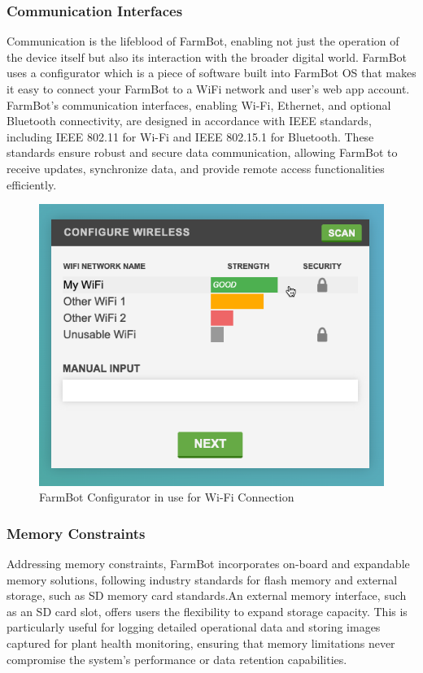 \subsubsection{Communication Interfaces}
Communication is the lifeblood of FarmBot, enabling not just the operation of the device itself but also its interaction with the broader digital world. FarmBot uses a configurator which  is a piece of software built into FarmBot OS that makes it easy to connect your FarmBot to a WiFi network and user's web app account. FarmBot's communication interfaces, enabling Wi-Fi, Ethernet, and optional Bluetooth connectivity, are designed in accordance with IEEE standards, including IEEE 802.11 for Wi-Fi and IEEE 802.15.1 for Bluetooth. These standards ensure robust and secure data communication, allowing FarmBot to receive updates, synchronize data, and provide remote access functionalities efficiently.

\begin{figure}[H]
    \centering
\includegraphics[scale=0.5]{./Figures/farmbot_wifi_connections.png}
\caption{FarmBot Configurator in use for Wi-Fi Connection}
\end{figure}

\subsubsection{Memory Constraints}
Addressing memory constraints, FarmBot incorporates on-board and expandable memory solutions, following industry standards for flash memory and external storage, such as SD memory card standards.An external memory interface, such as an SD card slot, offers users the flexibility to expand storage capacity. This is particularly useful for logging detailed operational data and storing images captured for plant health monitoring, ensuring that memory limitations never compromise the system's performance or data retention capabilities.

